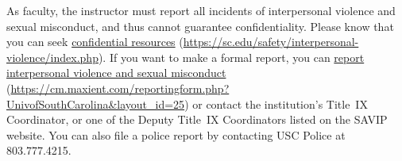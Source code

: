 \documentclass[11pt,letterpaper]{article}
\begin{document}
As faculty, the instructor must report all incidents of interpersonal violence and sexual misconduct, and thus cannot guarantee confidentiality. Please know that you can seek \href{https://sc.edu/safety/interpersonal-violence/index.php}{confidential resources} (\url{https://sc.edu/safety/interpersonal-violence/index.php}). If you want to make a formal report, you can \href{https://cm.maxient.com/reportingform.php?UnivofSouthCarolina\&layout\_id=25}{report interpersonal violence and sexual misconduct} (\url{https://cm.maxient.com/reportingform.php?UnivofSouthCarolina\&layout\_id=25}) or contact the institution's Title~IX Coordinator, or one of the Deputy Title~IX Coordinators listed on the SAVIP website. You can also file a police report by contacting USC Police at 803.777.4215. \sectionbreak





\newpage





\end{document}
